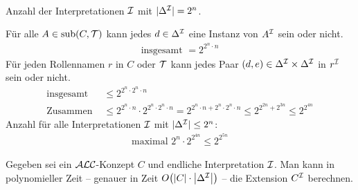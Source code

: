 \begin{tafel}\mbox{}\\
    Anzahl der Interpretationen $\mathcal{I}$ mit $|\Delta^{\mathcal{I}}| = 2^n$.
    
    Für alle $A \in \operatorname{sub}(C, \mathcal{T})$ kann jedes $d \in \Delta^{\mathcal{I}}$ eine Instanz von $A^{\mathcal{I}}$ sein oder nicht.
    \begin{align*}
        \text{insgesamt } = 2^{2^{n} \cdot n}
    \end{align*}
    Für jeden Rollennamen $r$ in $C$ oder $\mathcal{T}$ kann jedes Paar $(d, e) \in \Delta^{\mathcal{I}} \times \Delta^{\mathcal{I}}$ in $r^{\mathcal{I}}$ sein oder nicht.
    \begin{align*}
        \text{insgesamt } &\leq 2^{2^n \cdot 2^n \cdot n}\\
        \text{Zusammen } &\leq 2^{2^n \cdot n} \cdot 2^{2^n \cdot 2^n \cdot n} = 2^{2^n \cdot n + 2^n \cdot 2^n \cdot n} \leq 2^{2^{2n} + 2^{3n}} \leq 2^{2^{4n}}
    \end{align*}
    Anzahl für alle Interpretationen $\mathcal{I}$ mit $|\Delta^{\mathcal{I}}| \leq 2^n$:
    \begin{align*}
        \text{maximal } 2^n \cdot 2^{2^{4n}} \leq 2^{2^{5n}}
    \end{align*}
\end{tafel}

\begin{lemma}
    \label{lem:extensionsberechnung}
Gegeben sei ein $\mathcal{A}\mathcal{L}\mathcal{C}$-Konzept $C$ und endliche Interpretation $\mathcal{I}$. Man kann in polynomieller Zeit -- genauer in Zeit $O\left( \left| C \right| \cdot \left| \Delta^\MI \right| \right)$ -- die Extension $C^{\mathcal{I}}$ berechnen.
\end{lemma}

